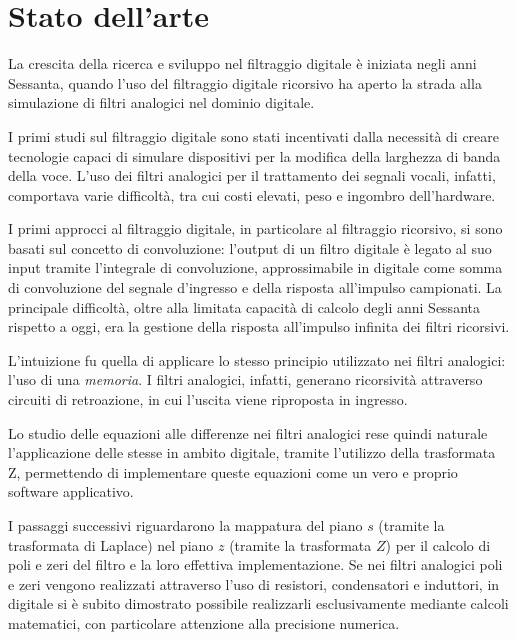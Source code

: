 \documentclass[12pt]{report}
\begin{document}
% 
% 

\chapter{Stato dell'arte}
\label{chap:stato_arte}
La crescita della ricerca e sviluppo nel filtraggio digitale è iniziata negli anni Sessanta, quando l'uso del filtraggio digitale ricorsivo ha aperto la strada alla simulazione di filtri analogici nel dominio digitale. 

I primi studi sul filtraggio digitale sono stati incentivati dalla necessità di creare tecnologie capaci di simulare dispositivi per la modifica della larghezza di banda della voce. L'uso dei filtri analogici per il trattamento dei segnali vocali, infatti, comportava varie difficoltà, tra cui costi elevati, peso e ingombro dell'hardware.

I primi approcci al filtraggio digitale, in particolare al filtraggio ricorsivo, si sono basati sul concetto di convoluzione: l’output di un filtro digitale è legato al suo input tramite l’integrale di convoluzione, approssimabile in digitale come somma di convoluzione del segnale d’ingresso e della risposta all’impulso campionati. La principale difficoltà, oltre alla limitata capacità di calcolo degli anni Sessanta rispetto a oggi, era la gestione della risposta all'impulso infinita dei filtri ricorsivi.

L’intuizione fu quella di applicare lo stesso principio utilizzato nei filtri analogici: l’uso di una \textit{memoria}. I filtri analogici, infatti, generano ricorsività attraverso circuiti di retroazione, in cui l’uscita viene riproposta in ingresso.

Lo studio delle equazioni alle differenze nei filtri analogici rese quindi naturale l’applicazione delle stesse in ambito digitale, tramite l'utilizzo della trasformata Z, permettendo di implementare queste equazioni come un vero e proprio software applicativo.

I passaggi successivi riguardarono la mappatura del piano \( s \) (tramite la trasformata di Laplace) nel piano \( z \) (tramite la trasformata \( Z \)) per il calcolo di poli e zeri del filtro e la loro effettiva implementazione. Se nei filtri analogici poli e zeri vengono realizzati attraverso l’uso di resistori, condensatori e induttori, in digitale si è subito dimostrato possibile realizzarli esclusivamente mediante calcoli matematici, con particolare attenzione alla precisione numerica.
\end{document}
